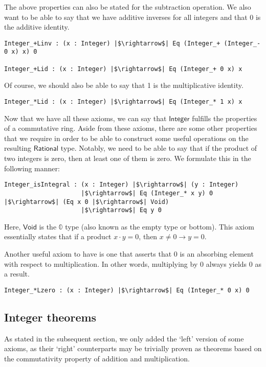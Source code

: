 \documentclass[12pt,twoside,maitrise]{dms}
\theoremstyle{definition}
\numberwithin{equation}{section}
\numberwithin{table}{chapter}
\numberwithin{figure}{chapter}
\newcommand\kw[1] {\textsf{#1}}
\begin{document}
The above properties can also be stated for the subtraction operation. We also
want to be able to say that we have additive inverses for all integers and that
0 is the additive identity.

\begin{verbatim}
Integer_+Linv : (x : Integer) |$\rightarrow$| Eq (Integer_+ (Integer_- 0 x) x) 0

Integer_+Lid : (x : Integer) |$\rightarrow$| Eq (Integer_+ 0 x) x
\end{verbatim}

Of course, we should also be able to say that 1 is the multiplicative identity.

\begin{verbatim}
Integer_*Lid : (x : Integer) |$\rightarrow$| Eq (Integer_* 1 x) x
\end{verbatim}

Now that we have all these axioms, we can say that $\kw{Integer}$ fulfills the
properties of a commutative ring. Aside from these axioms, there are some other
properties that we require in order to be able to construct some useful
operations on the resulting $\kw{Rational}$ type. Notably, we need to be able to
say that if the product of two integers is zero, then at least one of them is
zero. We formulate this in the following manner:

\begin{verbatim}
Integer_isIntegral : (x : Integer) |$\rightarrow$| (y : Integer)
                     |$\rightarrow$| Eq (Integer_* x y) 0 |$\rightarrow$| (Eq x 0 |$\rightarrow$| Void)
                     |$\rightarrow$| Eq y 0
\end{verbatim}

Here, $\kw{Void}$ is the $\mathbb{0}$ type (also known as the empty type or
bottom). This axiom essentially states that if a product $x \cdot y = 0$, then
$x \ne 0 \rightarrow y = 0$.

Another useful axiom to have is one that asserts that 0 is an absorbing element
with respect to multiplication. In other words, multiplying by 0 always yields 0
as a result.

\begin{verbatim}
Integer_*Lzero : (x : Integer) |$\rightarrow$| Eq (Integer_* 0 x) 0
\end{verbatim}

\subsection*{Integer theorems}\label{subsection:int-theorems}
As stated in the subsequent section, we only added the `left' version of some
axioms, as their `right' counterparts may be trivially proven as theorems based
on the commutativity property of addition and multiplication.
\end{document}
